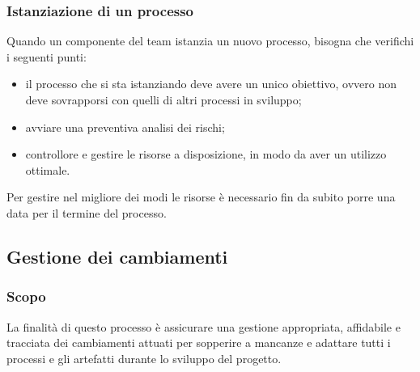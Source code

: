 \subsubsection{Istanziazione di un processo}
Quando un componente del team istanzia un nuovo processo, bisogna che verifichi i seguenti punti:
\begin{itemize}
    \item il processo che si sta istanziando deve avere un unico obiettivo,  ovvero non deve sovrapporsi con quelli di altri processi  in sviluppo;
    \item avviare una preventiva analisi dei rischi;
    \item controllore e gestire le risorse a disposizione, in modo da aver un utilizzo ottimale.
\end{itemize}
Per gestire nel migliore dei modi le risorse è necessario fin da subito porre una data per il termine del processo.

\subsection{Gestione dei cambiamenti} \label{_gestioneDeiCambiamenti}
\subsubsection{Scopo}
La finalità di questo processo è assicurare una gestione appropriata, affidabile e tracciata
dei cambiamenti attuati per sopperire a mancanze e adattare tutti i processi e gli artefatti durante lo sviluppo del progetto.

